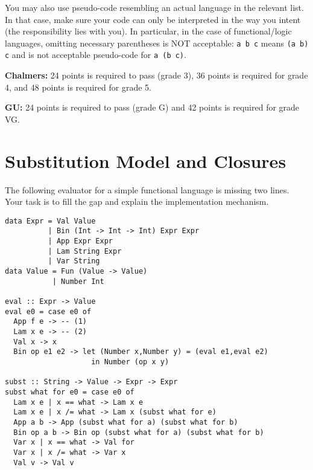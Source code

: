 \documentclass{article}
\begin{document}
You may also use pseudo-code resembling an actual language in the
relevant list. In that case, make sure your code can only be
interpreted in the way you intent (the responsibility lies with
you). In particular, in the case of functional/logic languages,
omitting necessary parentheses is NOT acceptable: \texttt{a b c} means
\texttt{(a b) c} and is not acceptable pseudo-code for \texttt{a (b
  c)}.


\textbf{Chalmers:}
24 points is required to pass (grade 3), 36 points is required for
grade 4, and 48 points is required for grade 5.

\textbf{GU:}
24 points is required to pass (grade G) and 42 points is
required for grade VG.


\section{Substitution Model and Closures}

The following evaluator for a simple functional language is missing
two lines. Your task is to fill the gap and explain the implementation
mechanism.


\begin{verbatim}
data Expr = Val Value
          | Bin (Int -> Int -> Int) Expr Expr
          | App Expr Expr
          | Lam String Expr
          | Var String
data Value = Fun (Value -> Value)
           | Number Int

eval :: Expr -> Value
eval e0 = case e0 of
  App f e -> -- (1)
  Lam x e -> -- (2)
  Val x -> x
  Bin op e1 e2 -> let (Number x,Number y) = (eval e1,eval e2)
                    in Number (op x y)

subst :: String -> Value -> Expr -> Expr
subst what for e0 = case e0 of
  Lam x e | x == what -> Lam x e
  Lam x e | x /= what -> Lam x (subst what for e)
  App a b -> App (subst what for a) (subst what for b)
  Bin op a b -> Bin op (subst what for a) (subst what for b)
  Var x | x == what -> Val for
  Var x | x /= what -> Var x
  Val v -> Val v
\end{verbatim}
\end{document}
